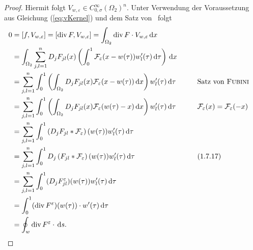 \begin{proof}
  Hiermit folgt $V_{w,\varepsilon} \in C_{0,\sigma}^\infty(\Omega_2)^n$.
  Unter Verwendung der Voraussetzung aus Gleichung (\ref{eq:vKernel}) und dem Satz von \fubini\ folgt
  \begingroup
  \addtolength{\jot}{1em}
  \begin{alignat*}{2}
    0
    &= [f, V_{w, \varepsilon}] %
    = [\div F, V_{w, \varepsilon}] %
    = \int_{\Omega_2} \div F \cdot V_{w, \varepsilon} \d x \\
    &= \int_{\Omega_2} \sum_{j,l=1}^n D_j F_{jl}(x) \left( \int_0^1 \mathcal{F}_\varepsilon(x - w(\tau))w_l'(\tau) \d\tau \right) \d x \\
    &= \sum_{j,l=1}^n \int_0^1 \left(\int_{\Omega_2}  D_j F_{jl}(x) \mathcal{F}_\varepsilon(x - w(\tau))\d x \right) w_l'(\tau) \d\tau \qquad &&\text{Satz von \fubini}\\
    &= \sum_{j,l=1}^n \int_0^1 \left(\int_{\Omega_2}  D_j F_{jl}(x) \mathcal{F}_\varepsilon(w(\tau) - x)\d x \right) w_l'(\tau) \d\tau \qquad &&\mathcal{F}_\varepsilon(x) = \mathcal{F}_\varepsilon(-x)\\
    &= \sum_{j,l=1}^n \int_0^1 \left(D_j F_{jl} \ast \mathcal{F}_\varepsilon\right)(w(\tau)) w_l'(\tau) \d\tau \\
    &= \sum_{j,l=1}^n \int_0^1 D_j\left(F_{jl} \ast \mathcal{F}_\varepsilon\right)(w(\tau)) w_l'(\tau) \d\tau \qquad && \text{(1.7.17)}\\
    &= \sum_{j,l=1}^n \int_0^1 (D_j F_{jl}^\varepsilon)(w(\tau)) w_l'(\tau) \d\tau \\
    &= \int_0^1 (\div F^\varepsilon)(w(\tau)) \cdot w'(\tau) \d\tau \\
    &= \oint_w \div F^\varepsilon \cdot \d s.
  \end{alignat*}
  \endgroup


\end{proof}
